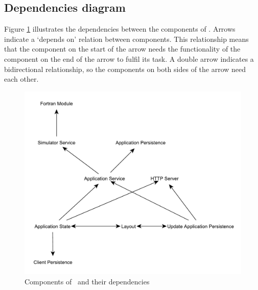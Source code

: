\subsection{Dependencies diagram}
\label{subsec:depdiag}
Figure \ref{fig:compdependencies} illustrates the dependencies between the components of \projectname. Arrows indicate a `depends on' relation between components. This relationship means that the component on the start of the arrow needs the functionality of the component on the end of the arrow to fulfil its task. A double arrow indicates a bidirectional relationship, so the components on both sides of the arrow need each other.

\noindent
\begin{figure}[h!b]
	\centering
	\includegraphics[width=\textwidth]{ComponentDependencies}
	\caption{Components of \projectname\ and their dependencies}
	\label{fig:compdependencies}
\end{figure}